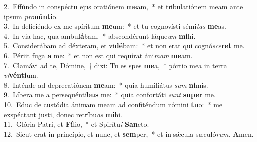 {2.~}Effúndo in conspéctu ejus oratiónem \textbf{me}am,~* et tribulatiónem meam ante ipsum \textit{pro}\textbf{nún}\textbf{ti}o.\\
{3.~}In deficiéndo ex me spíritum \textbf{me}um:~* et tu cognovísti sémi\textit{tas} \textbf{me}as.\\
{4.~}In via hac, qua ambu\textbf{lá}bam,~* abscondérunt láque\textit{um} \textbf{mi}hi.\\
{5.~}Considerábam ad déxteram, et vi\textbf{dé}bam:~* et non erat qui cognó\textit{sce}\textbf{ret} me.\\
{6.~}Périit fuga \textbf{a} me:~* et non est qui requírat áni\textit{mam} \textbf{me}am.\\
{7.~}Clamávi ad te, Dómine,~† dixi: Tu es spes \textbf{me}a,~* pórtio mea in terra \textit{vi}\textbf{vén}\textbf{ti}um.\\
{8.~}Inténde ad deprecatiónem \textbf{me}am:~* quia humiliátus \textit{sum} \textbf{ni}mis.\\
{9.~}Líbera me a persequénti\textbf{bus} me:~* quia confortáti \textit{sunt} \textbf{su}\textbf{per} me.\\
{10.~}Educ de custódia ánimam meam ad confiténdum nómini \textbf{tu}o:~* me exspéctant justi, donec retríbu\textit{as} \textbf{mi}hi.\\
{11.~}Glória Patri, et \textbf{Fí}lio,~* et Spirítu\textit{i} \textbf{San}cto.\\
{12.~}Sicut erat in princípio, et nunc, et \textbf{sem}per,~* et in sǽcula sæculó\textit{rum}. \textbf{A}men.\\

